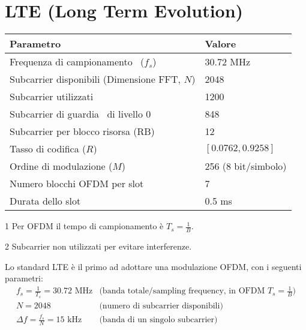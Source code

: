 \section*{LTE (Long Term Evolution)}


\begin{center}
    \begin{threeparttable}
        \begin{tabular}{|l|l|} 
            \hline
            \textbf{Parametro} & \textbf{Valore} \\
            \hline
             Frequenza di campionamento\tnote{1 } \  ($f_s$) & 30.72 MHz \\
            \hline
            Subcarrier disponibili (Dimensione FFT, $N$) & 2048 \\
            \hline
            Subcarrier utilizzati & 1200 \\
            \hline
            Subcarrier di guardia\tnote{2} \ di livello 0 & 848 \\
            \hline
            Subcarrier per blocco risorsa (RB) & 12 \\
            \hline
            Tasso di codifica ($R$) & $[0.0762, 0.9258]$ \\
            \hline
            Ordine di modulazione ($M$) & 256 (8 bit/simbolo) \\
            \hline
            Numero blocchi OFDM per slot & 7 \\
            \hline
            Durata dello slot & 0.5 ms \\
            \hline
        \end{tabular}
        \begin{tablenotes}
            \item[1] Per OFDM il tempo di campionamento è $T_s = \frac{1}{B}$.
            \item[2] Subcarrier non utilizzati per evitare interferenze.
        \end{tablenotes}
    \end{threeparttable}
\end{center}
Lo standard LTE è il primo ad adottare una modulazione OFDM, con i seguenti parametri:
\[
    \begin{array}{ll}
        f_s = \frac{1}{T_s} = 30.72 \text{ MHz} & \text{(banda totale/sampling frequency, in OFDM $T_s=\frac{1}{B}$)} \\
        N = 2048 & \text{(numero di subcarrier disponibili)} \\
        \Delta f = \frac{f_s}{N} = 15 \text{ kHz} & \text{(banda di un singolo subcarrier)} \\
    \end{array}    
\]
